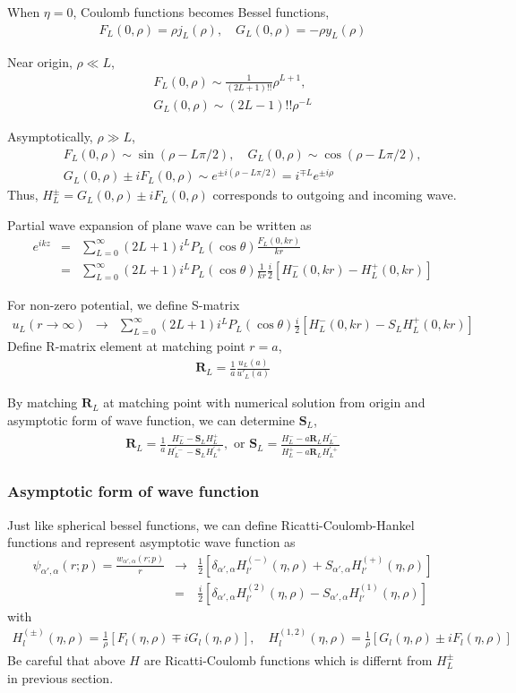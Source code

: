 \documentclass[10pt]{article}
\def\bm{\boldsymbol}
\newcommand{\bea}{\begin{eqnarray}}
\newcommand{\eea}{\end{eqnarray}}
\newcommand{\no}{\nonumber \\}
\begin{document}
When $\eta=0$, Coulomb functions becomes Bessel functions,
\bea
F_L(0,\rho)=\rho j_L(\rho),
\quad G_L(0,\rho)=-\rho y_L(\rho)
\eea

Near origin, $\rho\ll L$,
\bea
F_L(0,\rho)\sim \frac{1}{(2L+1)!!} \rho^{L+1},\no
G_L(0,\rho)\sim (2L-1)!! \rho^{-L}
\eea

Asymptotically, $\rho\gg L$,
\bea
& &F_L(0,\rho)\sim \sin(\rho-L\pi/2),\quad
G_L(0,\rho)\sim \cos(\rho-L\pi/2),\no
& & G_L(0,\rho)\pm i F_L(0,\rho)
 \sim e^{\pm i(\rho-L\pi/2)}= i^{\mp L} e^{\pm i\rho}
\eea
Thus, $H_L^{\pm}=G_L(0,\rho)\pm i F_L(0,\rho)$ corresponds to 
outgoing and incoming wave.

Partial wave expansion of plane wave can be written as
\bea
e^{ikz}&=&\sum_{L=0}^\infty (2L+1) i^L P_L(\cos\theta)
                   \frac{F_L(0,kr)}{kr} \no
       &=&\sum_{L=0}^\infty (2L+1) i^L P_L(\cos\theta)
          \frac{1}{kr}\frac{i}{2}[H_L^{-}(0,kr)-H_L^{+}(0,kr)]        
\eea

For non-zero potential, we define S-matrix
\bea
u_L(r\to \infty)&\to&
          \sum_{L=0}^\infty (2L+1) i^L P_L(\cos\theta)
          \frac{i}{2}[H_L^{-}(0,kr)-S_L H_L^{+}(0,kr)]        
\eea
Define R-matrix element at matching point $r=a$,
\bea
{\bm R}_L=\frac{1}{a}\frac{u_L(a)}{u'_L(a)}
\eea

By matching ${\bm R}_L$ at matching point with numerical
solution from origin and asymptotic form of wave function,
we can determine ${\bm S}_L$, 
\bea
{\bm R}_L=\frac{1}{a}
 \frac{H_{L}^- - {\bm S}_L H_L^+}{H_{L}^{'-} - {\bm S}_L H_L^{'+}},
 \mbox{ or }
{\bm S}_L =\frac{ H^-_L - a {\bm R}_L H^{'-}_L}
            {H^+_L - a {\bm R}_L H^{'+}_L} 
\eea



\subsubsection{Asymptotic form of wave function}
Just like spherical bessel functions, we can define
Ricatti-Coulomb-Hankel functions 
and represent asymptotic wave 
function as
\bea
\psi_{\alpha',\alpha}(r;p)=\frac{w_{\alpha',\alpha}(r;p)}{r}
&\to& \frac{1}{2}[\delta_{\alpha',\alpha}H_{l'}^{(-)}(\eta,\rho)
           +S_{\alpha',\alpha} H_{l'}^{(+)}(\eta,\rho)]\no
&=&\frac{i}{2}[\delta_{\alpha',\alpha}H_{l'}^{(2)}(\eta,\rho)
           -S_{\alpha',\alpha} H_{l'}^{(1)}(\eta,\rho)]
\eea
with
\bea
H_{l}^{(\pm)}(\eta,\rho)=\frac{1}{\rho}[F_{l}(\eta,\rho)\mp i G_l(\eta,\rho)],
\quad
H_{l}^{(1,2)}(\eta,\rho)=\frac{1}{\rho}[G_l(\eta,\rho)\pm i F_l(\eta,\rho)]
\eea
Be careful that above $H$ are Ricatti-Coulomb functions
which is differnt from $H_L^{\pm}$ in previous section.
\end{document}
